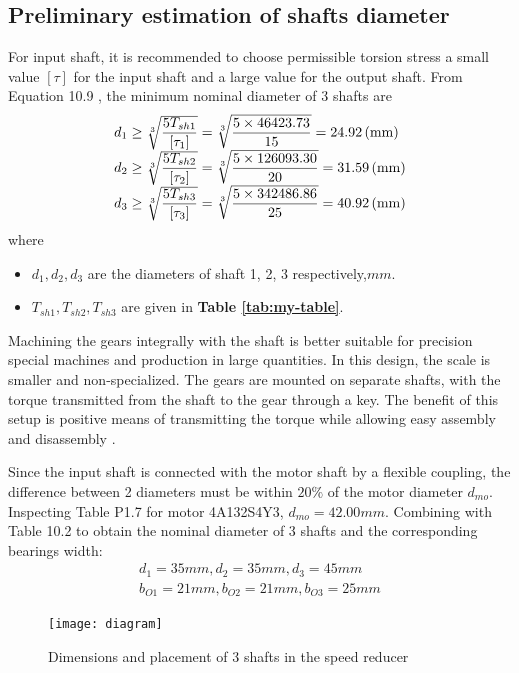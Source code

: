 \subsection{Preliminary estimation of shafts diameter}
For input shaft, it is recommended to choose permissible torsion stress a small value $ [\tau] $ for the input shaft and a large value for the output shaft. From Equation 10.9 \cite{tk1}, the minimum nominal diameter of 3 shafts are
\[
\begin{array}{l}
d_1 \geq \sqrt[3]{\dfrac{5T_{sh1}}{[\tau_1]}} = \sqrt[3]{\dfrac{5\times 46423.73}{15}} = 24.92 \, (\mathrm{mm})\\
d_2 \geq \sqrt[3]{\dfrac{5T_{sh2}}{[\tau_2]}} = \sqrt[3]{\dfrac{5\times 126093.30}{20}} = 31.59 \, (\mathrm{mm})\\
d_3 \geq \sqrt[3]{\dfrac{5T_{sh3}}{[\tau_3]}} = \sqrt[3]{\dfrac{5\times 342486.86}{25}} = 40.92 \, (\mathrm{mm})
\end{array}
\]
where
\begin{itemize}
	\item $ d_1,d_2,d_3 $ are the diameters of shaft 1, 2, 3 respectively,$ \unit{mm} $.
	\item $ T_{sh1},T_{sh2},T_{sh3}$ are given in \textbf{Table \ref{tab:my-table}}.
\end{itemize}

Machining the gears integrally with the shaft is better suitable for precision special machines and production in large quantities. In this design, the scale is smaller and non-specialized. The gears are mounted on separate shafts, with the torque transmitted from the shaft to the gear through a key. The benefit of this setup is positive means of transmitting the torque while allowing easy assembly and disassembly \cite{mott_vavrek_wang_2018}.

Since the input shaft is connected with the motor shaft by a flexible coupling, the difference between 2 diameters must be within $ 20\% $ of the motor diameter $ d_{mo} $. Inspecting Table P1.7 for motor 4A132S4Y3, $ d_{mo}=42.00\unit{mm} $. Combining with Table 10.2 \cite{tk1} to obtain the nominal diameter of 3 shafts and the corresponding bearings width:
\[
\begin{array}{l}
d_1=35\unit{mm},d_2=35\unit{mm},d_3=45\unit{mm}\\
b_{O1}=21\unit{mm},b_{O2}=21\unit{mm},b_{O3}=25\unit{mm}
\end{array}
\]

\begin{figure}[ht]
	\centering
	\texttt{[image: diagram]}
	\caption{Dimensions and placement of 3 shafts in the speed reducer}
	\label{shaft}
\end{figure}

